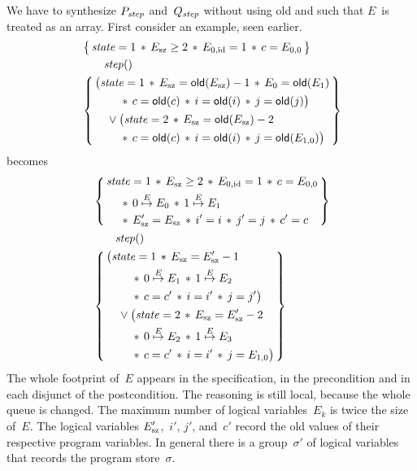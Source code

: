 \documentclass{article} %
\newcommand{\3}[3]{\{\,#1\,\}\;#2\;\{\,#3\,\}}
\newcommand{\eto}{\stackrel E\mapsto}
\renewcommand{\*}{\,*\,}
\begin{document}
We have to synthesize $P_{\it step}$ and~$Q_{\it step}$ without using {\sf old} and such that $E$~is treated as an array.
First consider an example, seen earlier.
\begin{align*}
  &\left\{\,\begin{aligned}
  {\it state}=1 \* E_{\rm sz}\ge2 \* E_{0,{\rm id}}=1 \* c=E_{0,0}
  \end{aligned}\,\right\}\\
  &\qquad{\it step}() \\
  &\left\{\,\begin{aligned}
  &\bigl(
    {\it state}=1 \* E_{\rm sz}={\sf old}(E_{\rm sz})-1 \* E_0={\sf old}(E_1) \\
  &\qquad\* c={\sf old}(c) \* i={\sf old}(i) \* j={\sf old}(j) \bigr) \\
  &\quad\lor\bigl(
    {\it state}=2 \* E_{\rm sz}={\sf old}(E_{\rm sz})-2 \\
  &\qquad\* c={\sf old}(c) \* i={\sf old}(i) \* j={\sf old}(E_{1,0}) \bigr)
  \end{aligned}\,\right\}
\end{align*}
becomes
\begin{align*}
  &\left\{\,\begin{aligned}
  &{\it state}=1 \* E_{\rm sz}\ge2 \* E_{0,{\rm id}}=1 \* c=E_{0,0} \\
  &\quad\* 0\eto E_0 \* 1\eto E_1 \\
  &\quad\* E'_{\rm sz}=E_{\rm sz}\* i'=i \* j'=j \* c'=c
  \end{aligned}\,\right\} \\
  &\qquad{\it step}() \\
  &\left\{\,\begin{aligned}
  &\bigl(
    {\it state}=1 \* E_{\rm sz}=E'_{\rm sz}-1 \\
  &\qquad\* 0\eto E_1 \* 1\eto E_2 \\
  &\qquad\* c=c' \* i=i' \* j=j' \bigr) \\
  &\quad\lor\bigl(
    {\it state}=2 \* E_{\rm sz}=E'_{\rm sz}-2 \\
  &\qquad\* 0\eto E_2 \* 1\eto E_3 \\
  &\qquad\* c=c' \* i=i' \* j=E_{1,0} \bigr)
  \end{aligned}\,\right\}
\end{align*}
The whole footprint of~$E$ appears in the specification, in the precondition and in each disjunct of the postcondition.
The reasoning is still local, because the whole queue is changed.
The maximum number of logical variables~$E_k$ is twice the size of~$E$.
The logical variables $E'_{\rm sz}$,~$i'$, $j'$, and~$c'$ record the old values of their respective program variables.
In general there is a group~$\sigma'$ of logical variables that records the program store~$\sigma$.
\end{document}
